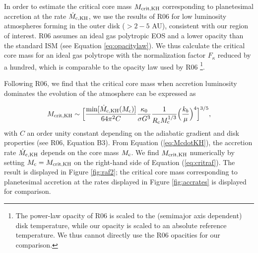 \documentclass[apj]{emulateapj}
\newcommand{\co}{_{\rm c}}
\begin{document}


In order to estimate the critical core mass $M_{\rm crit, KH}$ corresponding to planetesimal accretion at the rate $\dot{M}_{\rm c, KH}$, we use the results of R06 for low luminosity atmospheres forming in the outer disk ($>2-5$ AU), consistent with our region of interest. R06 assumes an ideal gas polytropic EOS and a lower opacity than the standard ISM (see Equation \ref{eq:opacitylaw}). We thus calculate the critical core mass for an ideal gas polytrope with the normalization factor $F_{\kappa}$ reduced by a hundred, which is comparable to the opacity law used by R06 \footnote{The power-law opacity of R06 is scaled to the (semimajor axis dependent) disk temperature, while our opacity is scaled to an absolute reference temperature. We thus cannot directly use the R06 opacities for our comparison.}. %

Following R06, we find that the critical core mass when accretion luminosity dominates the evolution of the atmosphere can be expressed as

\begin{equation}
\label{eq:critraf}
M_{\rm{crit, KH}} \sim \Big[\frac{\min[\dot{M}_{\rm c, KH}(M_{\rm{c}})]}{64 \pi^2 C} \frac{\kappa_0}{\sigma G^3} \frac{1}{R\co M\co^{1/3}} \Big(\frac{k_b}{\mu}\Big)^4\Big]^{3/5},
\end{equation}
with $C$ an order unity constant depending on the adiabatic gradient and disk properties (see R06, Equation B3). From Equation (\ref{eq:McdotKH}), the accretion rate $\dot{M}_{\rm c, KH}$ depends on the core mass $M\co$. We find $M_{\rm crit, KH}$ numerically by setting $M\co=M_{\rm crit, KH}$ on the right-hand side of Equation (\ref{eq:critraf}). The result is displayed in Figure \ref{fig:raf2}; the critical core mass corresponding to planetesimal accretion at the rates displayed in Figure \ref{fig:accrates} is displayed for comparison.  
\end{document}
